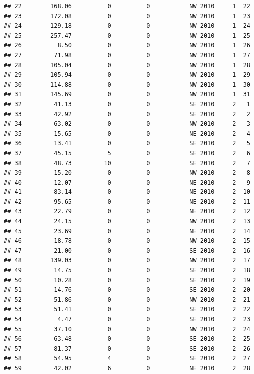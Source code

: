 \documentclass[
]{article}
\begin{document}
\begin{verbatim}
## 22        168.06          0          0           NW 2010     1  22
## 23        172.08          0          0           NW 2010     1  23
## 24        129.18          0          0           NW 2010     1  24
## 25        257.47          0          0           NW 2010     1  25
## 26          8.50          0          0           NW 2010     1  26
## 27         71.98          0          0           NW 2010     1  27
## 28        105.04          0          0           NW 2010     1  28
## 29        105.94          0          0           NW 2010     1  29
## 30        114.88          0          0           NW 2010     1  30
## 31        145.69          0          0           NW 2010     1  31
## 32         41.13          0          0           SE 2010     2   1
## 33         42.92          0          0           SE 2010     2   2
## 34         63.02          0          0           NW 2010     2   3
## 35         15.65          0          0           NE 2010     2   4
## 36         13.41          0          0           SE 2010     2   5
## 37         45.15          5          0           SE 2010     2   6
## 38         48.73         10          0           SE 2010     2   7
## 39         15.20          0          0           NW 2010     2   8
## 40         12.07          0          0           NE 2010     2   9
## 41         83.14          0          0           NE 2010     2  10
## 42         95.65          0          0           NE 2010     2  11
## 43         22.79          0          0           NE 2010     2  12
## 44         24.15          0          0           NW 2010     2  13
## 45         23.69          0          0           NE 2010     2  14
## 46         18.78          0          0           NW 2010     2  15
## 47         21.00          0          0           SE 2010     2  16
## 48        139.03          0          0           NW 2010     2  17
## 49         14.75          0          0           SE 2010     2  18
## 50         10.28          0          0           SE 2010     2  19
## 51         14.76          0          0           SE 2010     2  20
## 52         51.86          0          0           NW 2010     2  21
## 53         51.41          0          0           SE 2010     2  22
## 54          4.47          0          0           SE 2010     2  23
## 55         37.10          0          0           NW 2010     2  24
## 56         63.48          0          0           SE 2010     2  25
## 57         81.37          0          0           SE 2010     2  26
## 58         54.95          4          0           SE 2010     2  27
## 59         42.02          6          0           NE 2010     2  28

\end{verbatim}
\end{document}
